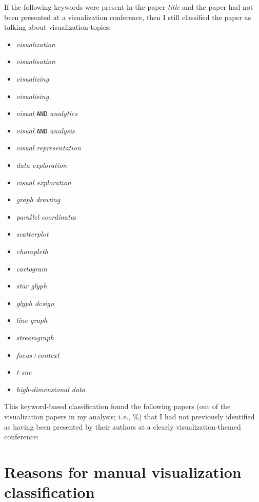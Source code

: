\documentclass[conference,svgnames]{vgtc}                     %
\newcommand*{\percentageRounded}[2]{%
	\pgfmathparse{#1*100/#2}%
	\pgfmathprintnumber[fixed, precision=1]{\pgfmathresult}%
}
\newcommand{\ie}{i.\,e.}
\begin{document}
If the following keywords were present in the paper \emph{title} and the paper had not been presented at a visualization conference, then I still classified the paper as talking about visualization topics:
\begin{itemize}[parsep=0pt]
\item \emph{visualization}
\item \emph{visualisation}
\item \emph{visualizing}
\item \emph{visualising}
\item \emph{visual} \texttt{AND} \emph{analytics}
\item \emph{visual} \texttt{AND} \emph{analysis}
\item \emph{visual representation}
\item \emph{data exploration}
\item \emph{visual exploration}
\item \emph{graph drawing}
\item \emph{parallel coordinate}s
\item \emph{scatterplot}
\item \emph{choropleth}
\item \emph{cartogram}
\item \emph{star glyph}
\item \emph{glyph design}
\item \emph{line graph}
\item \emph{streamgraph}
\item \emph{focus+context}
\item \emph{t-sne}
\item \emph{high-dimensional data}
\end{itemize}

This keyword-based classification found the following \GrsiVisByKeywordPapersCount{} papers (out of the \GrsiTotalVisPapers{} visualization papers in my analysis; \ie, \percentageRounded{\GrsiVisByKeywordPapersCount}{\GrsiTotalVisPapers}\%) that I had not previously identified as having been presented by their authors at a clearly visualization-themed conference:
\begin{itemize}[parsep=0pt]

\end{itemize}


\section{Reasons for manual visualization classification}
\label{app:manual-reasons}
\end{document}
